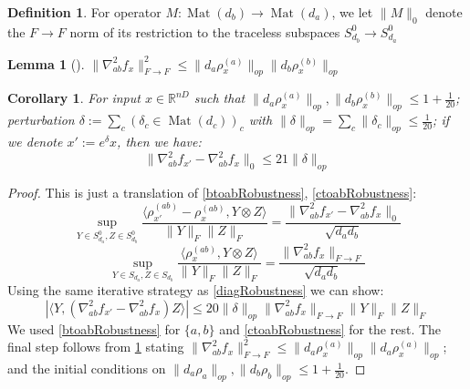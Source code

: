 \documentclass[aos]{imsart}
\newtheorem{corollary}[theorem]{Corollary}
\newtheorem{lemma}[theorem]{Lemma}
\theoremstyle{definition}
\newtheorem*{definition}{Definition}
\numberwithin{equation}{section}
\DeclareMathOperator{\Mat}{Mat}
\newcommand{\R}{{\mathbb{R}}}
\newcommand{\smallSym}{S}
\newcommand{\samp}{x}
\newcommand{\AR}[1]{{\color{orange}[AR: #1]}}
\begin{document}
\begin{appendix}
\begin{definition}
For operator $M : \Mat(d_{b}) \to \Mat(d_{a})$, we let $\|M\|_{0}$ denote the $F \to F$ norm of its restriction to the traceless subspaces $\smallSym^0_{d_b} \to \smallSym^0_{d_a}$
\end{definition}

\begin{lemma}[\cite{KLR19}] \label{inftyto2}
$\|\nabla^{2}_{ab} f_{\samp}\|_{F \to F}^{2} \leq \|d_{a} \rho_{\samp}^{(a)}\|_{op} \|d_{b} \rho_{\samp}^{(b)}\|_{op}$
\end{lemma}

\begin{corollary} \label{offdiagRobustness}
For input $\samp \in \R^{nD}$ such that $\|d_{a} \rho_{\samp}^{(a)}\|_{op}, \|d_{b} \rho_{\samp}^{(b)}\|_{op} \leq 1+\frac{1}{20}$; perturbation $\delta := \sum_{c} (\delta_{c} \in \Mat(d_{c}))_{c}$ with $\|\delta\|_{op} = \sum_{c} \|\delta_{c}\|_{op} \leq \frac{1}{20}$; if we denote $\samp' := e^{\delta} \samp$, then we have:
\[ \|\nabla^{2}_{ab} f_{\samp'} - \nabla^{2}_{ab} f_{\samp}\|_{0} \leq 21 \|\delta\|_{op}  \]
\end{corollary}
\begin{proof}
This is just a translation of \cref{btoabRobustness}, \cref{ctoabRobustness}:
\[ \sup_{Y \in \smallSym_{d_{a}}^{0}, Z \in \smallSym_{d_{b}}^{0}} \frac{\langle \rho_{\samp'}^{(ab)} - \rho_{\samp}^{(ab)}, Y \otimes Z \rangle}{\|Y\|_{F} \|Z\|_{F}} = \frac{\|\nabla^{2}_{ab} f_{\samp'} - \nabla^{2}_{ab} f_{\samp}\|_{0}}{\sqrt{d_{a} d_{b}} } \]
\[ \sup_{Y \in \smallSym_{d_{a}}, Z \in \smallSym_{d_{b}}} \frac{\langle \rho_{\samp}^{(ab)}, Y \otimes Z \rangle}{\|Y\|_{F} \|Z\|_{F}} = \frac{\|\nabla^{2}_{ab} f_{\samp}\|_{F \to F}}{\sqrt{d_{a} d_{b}} }       \]
Using the same iterative strategy as \cref{diagRobustness} we can show:
\[ |\langle Y, (\nabla^{2}_{ab} f_{\samp'} - \nabla^{2}_{ab} f_{\samp}) Z \rangle| \leq 20 \|\delta\|_{op} \|\nabla^{2}_{ab} f_{\samp}\|_{F \to F} \|Y\|_{F} \|Z\|_{F}    \]
We used \cref{btoabRobustness} for $\{a,b\}$ and \cref{ctoabRobustness} for the rest. The final step follows from \cref{inftyto2} stating $\|\nabla^{2}_{ab} f_{\samp}\|_{F \to F}^{2} \leq \|d_{a} \rho_{\samp}^{(a)}\|_{op} \|d_{a} \rho_{\samp}^{(a)}\|_{op}$; and the initial conditions on $\|d_{a} \rho_{a}\|_{op}, \|d_{b} \rho_{b}\|_{op} \leq 1 + \frac{1}{20}$.
\end{proof}


\end{appendix}
\end{document}
